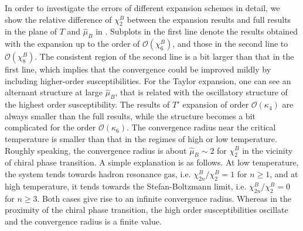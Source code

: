 \documentclass[%
reprint,
superscriptaddress,
preprintnumbers,
amsmath,amssymb,
aps,
prd,
]{revtex4-2}
\def\Fig#1{\Cref{#1}}
\begin{document}
In order to investigate the errors of different expansion schemes in detail, we show the relative difference of $\chi_2^B$ between the expansion results and full results in the plane of $T$ and $\hat \mu_B$ in \Fig{fig:heatchi}. Subplots in the first line denote the results obtained with the expansion up to the order of $\mathcal{O}(\chi_6^B)$, and those in the second line to $\mathcal{O}(\chi_8^B)$. The consistent region of the second line is a bit larger than that in the first line, which implies that the convergence could be improved mildly by including higher-order susceptibilities. For the Taylor expansion, one can see an alternant structure at large $\hat \mu_B$, that is related with the oscillatory structure of the highest order susceptibility. The results of $T'$ expansion of order $\mathcal{O}(\kappa_4)$ are always smaller than the full results, while the structure becomes a bit complicated for the order $\mathcal{O}(\kappa_6)$. The convergence radius near the critical temperature is smaller than that in the regimes of high or low temperature. Roughly speaking, the convergence radius is about $\hat \mu_B \sim 2$ for $\chi_2^B$ in the vicinity of chiral phase transition. A simple explanation is as follows. At low temperature, the system tends towards hadron resonance gas, i.e. $\chi_{2n}^B/\chi_2^B=1$ for $n\geq1$, and at high temperature, it tends towards the Stefan-Boltzmann limit, i.e. $\chi_{2n}^B/\chi_2^B=0$ for $n\geq3$. Both cases give rise to an infinite convergence radius. Whereas in the proximity of the chiral phase transition, the high order susceptibilities oscillate and the convergence radius is a finite value.
\end{document}
